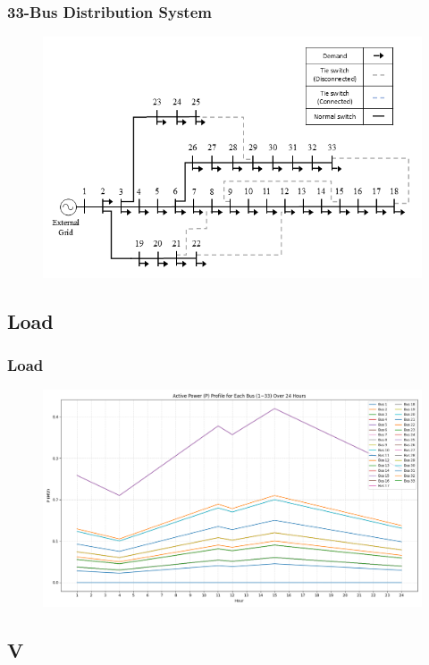 \documentclass[
	11pt, %
	aspectratio=169, %
]{beamer}
\begin{document}
\begin{frame}
	\frametitle{33-Bus Distribution System}

	\begin{figure}
		\includegraphics[width=4 in,keepaspectratio]{modified_33_bus.png}
	\end{figure}

	
\end{frame}


\subsection{Load}

\begin{frame}
	\frametitle{Load}

	\begin{figure}
		\includegraphics[width=4 in,keepaspectratio]{../fig/Load_P.png}
	\end{figure}

	
\end{frame}


\subsection{V}
\end{document}

